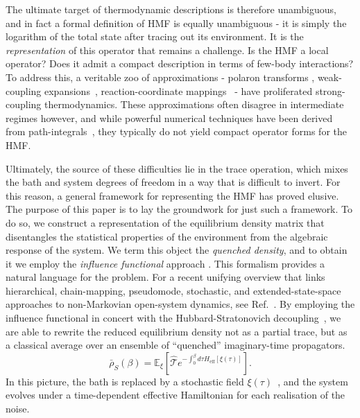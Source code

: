 \documentclass[aps,prl,twocolumn,superscriptaddress,showpacs,floatfix]{revtex4-2}
\begin{document}
The ultimate target of thermodynamic descriptions is therefore unambiguous, and in fact a formal definition of HMF is equally unambiguous - it is simply the logarithm of the total state after tracing out its environment. It is the \emph{representation} of this operator that remains a challenge. Is the HMF a local operator? Does it admit a compact description in terms of few-body interactions? To address this, a veritable zoo of approximations - polaron transforms \cite{jangNonequilibriumTheoryElectronic2008}, weak-coupling expansions~\cite{cresserWeakUltrastrongCoupling2021a}, reaction-coordinate mappings~ \cite{ShubrookIlesSmithNazir2025, duGeneralizedHamiltonianMeanforce2025a,nazirReactionCoordinateMapping2018,AntoSztrikacsNazirSegal2023,IlesSmithDijkstraLambertNazir2016} - have proliferated strong-coupling thermodynamics. These approximations often disagree in intermediate regimes however, and while powerful numerical techniques have been derived from path-integrals~\cite{moixEquilibriumreducedDensityMatrix2012,chenRigorousStochasticMatrix2014,makriExploitingClassicalDecoherence2014,tanimuraReducedHierarchicalEquations2014,songCalculationCorrelatedInitial2015,WaltersWang2024}, they typically do not yield compact operator forms for the HMF.

Ultimately, the source of these difficulties lie in the trace operation, which mixes the bath and system degrees of freedom in a way that is difficult to invert. For this reason, a general framework for representing the HMF has proved elusive. The purpose of this paper is to lay the groundwork for just such a framework. To do so, we construct a representation of the equilibrium density matrix that disentangles the statistical properties of the environment from the algebraic response of the system. We term this object the \emph{quenched density}, and to obtain it we employ the \emph{influence functional} approach \cite{feynmanTheoryGeneralQuantum1963a,caldeiraQuantumTunnellingDissipative1983a,grabertQuantumBrownianMotion1988}. This formalism provides a natural language for the problem. For a recent unifying overview that links hierarchical, chain-mapping, pseudomode, stochastic, and extended-state-space approaches to non-Markovian open-system dynamics, see Ref.~\cite{XuVadimovStockburgerAnkerhold2026}. By employing the influence functional in concert with the Hubbard-Stratonovich decoupling~\cite{hubbardCalculationPartitionFunctions1959a,stratonovich1957QDistro,stockburgerExactNumberRepresentation2002}, we are able to rewrite the reduced equilibrium density not as a partial trace, but as a classical average over an ensemble of ``quenched'' imaginary-time propagators.
\begin{equation}
    \bar{\rho}_S(\beta) = \mathbb{E}_{\xi}\left[ \hat{\mathcal{T}} e^{-\int_0^\beta d\tau H_{\mathrm{eff}}[\xi(\tau)]} \right].
\end{equation}
In this picture, the bath is replaced by a stochastic field $\xi(\tau)$~\cite{stockburgerSimulatingSpinbosonDynamics2004,mccaulPartitionfreeApproachOpen2017c,wiedmannNonMarkovianDynamicsQuantum2020,laneExactlyThermalizedQuantum2020,matosEfficientChoiceColored2020,matosStochasticEntropyProduction2022}, and the system evolves under a time-dependent effective Hamiltonian for each realisation of the noise.
\end{document}
